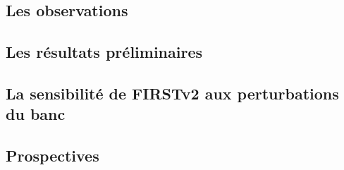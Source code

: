 \subsection{Les observations}

\subsection{Les résultats préliminaires}

\subsection{La sensibilité de FIRSTv2 aux perturbations du banc}

\subsection{Prospectives}


